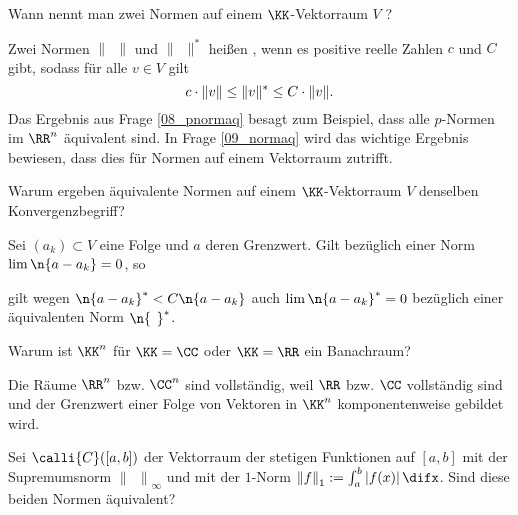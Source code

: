\begin{frage}
  Wann nennt man zwei Normen auf einem $\KK$-Vektorraum $V$ ?
\end{frage}

\begin{antwort}
  Zwei Normen $\| \;\, \|$ und $\| \;\, \|^*$ 
  heißen , wenn es positive reelle Zahlen 
  $c$ und $C$ gibt, sodass für alle $v\in V$ gilt
  \begin{equation}
    c \cdot \|  v \| \le \| v \|^* \le C \cdot \| v \|.
    \notag
  \end{equation}
  Das Ergebnis aus Frage \ref{08_pnormaq} besagt zum Beispiel, dass alle 
  $p$-Normen im $\RR^n$ äquivalent sind. In Frage \ref{09_normaq} wird das
  wichtige Ergebnis bewiesen, dass dies für 
   Normen auf einem 
   Vektorraum zutrifft. 
  \AntEnd 
\end{antwort}

\begin{frage}
  Warum ergeben äquivalente Normen auf einem 
  $\KK$-Vektorraum $V$ denselben Konvergenzbegriff?
\end{frage}

\begin{antwort}
  Sei $(a_k)\subset V$ eine Folge und $a$ deren Grenzwert. 
  Gilt bezüglich einer Norm 
  $\lim \n{ a- a_k } = 0$, so 

  gilt wegen $\n{ a-a_k }^* < C \n{ a-a_k }$ 
  auch $\lim \n{ a-a_k }^*=0$ bezüglich einer 
  äquivalenten Norm $\n{ \;\, }^*$. 
  \AntEnd 
\end{antwort}

\begin{frage}
  Warum ist $\KK^n$ für $\KK=\CC$ oder $\KK=\RR$ ein Banachraum?
\end{frage}

\begin{antwort}
  Die Räume $\RR^n$ bzw. $\CC^n$ sind vollständig, weil 
  $\RR$ bzw. $\CC$ vollständig sind und der Grenzwert einer Folge von 
  Vektoren in $\KK^n$ komponentenweise gebildet wird.
  \AntEnd
\end{antwort}

\begin{frage}
  \label{q:61}
  Sei $\calli{C}([a,b])$ der Vektorraum der stetigen Funktionen 
  auf $[a,b]$ mit der Supremumsnorm ${\| \; \, \|}_\infty$ und 
  mit der $1$-Norm ${\| f \|}_1 := \int_a^b \left| f(x) \right| \difx$. 
  Sind diese beiden Normen äquivalent?
\end{frage}


